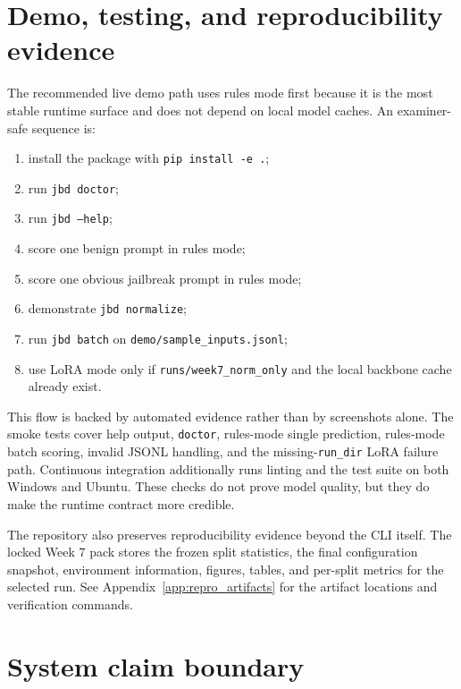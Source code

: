 \section{Demo, testing, and reproducibility evidence}

The recommended live demo path uses rules mode first because it is the most stable runtime surface and does not depend on local model caches. An examiner-safe sequence is:
\begin{enumerate}
  \item install the package with \texttt{pip install -e .};
  \item run \texttt{jbd doctor};
  \item run \texttt{jbd --help};
  \item score one benign prompt in rules mode;
  \item score one obvious jailbreak prompt in rules mode;
  \item demonstrate \texttt{jbd normalize};
  \item run \texttt{jbd batch} on \texttt{demo/sample\_inputs.jsonl};
  \item use LoRA mode only if \texttt{runs/week7\_norm\_only} and the local backbone cache already exist.
\end{enumerate}

This flow is backed by automated evidence rather than by screenshots alone. The smoke tests cover help output, \texttt{doctor}, rules-mode single prediction, rules-mode batch scoring, invalid JSONL handling, and the missing-\texttt{run\_dir} LoRA failure path. Continuous integration additionally runs linting and the test suite on both Windows and Ubuntu. These checks do not prove model quality, but they do make the runtime contract more credible.

The repository also preserves reproducibility evidence beyond the CLI itself. The locked Week 7 pack stores the frozen split statistics, the final configuration snapshot, environment information, figures, tables, and per-split metrics for the selected run. See Appendix~\ref{app:repro_artifacts} for the artifact locations and verification commands.

\section{System claim boundary}

